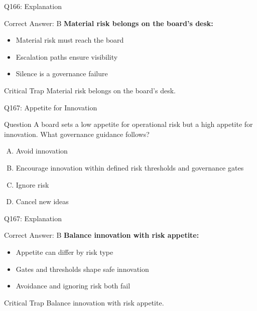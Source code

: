 \documentclass{beamer}
\begin{document}
	\begin{frame}{Q166: Explanation}
		\begin{block}{Correct Answer: B}
			\textbf{Material risk belongs on the board's desk:}
			\begin{itemize}
				\item Material risk must reach the board
				\item Escalation paths ensure visibility
				\item Silence is a governance failure
			\end{itemize}
		\end{block}
		\begin{alertblock}{Critical Trap}
			Material risk belongs on the board's desk.
		\end{alertblock}
	\end{frame}
	
	\begin{frame}{Q167: Appetite for Innovation}
		\begin{block}{Question}
			A board sets a low appetite for operational risk but a high appetite for innovation. What governance guidance follows?
		\end{block}
		\begin{enumerate}[(A)]
			\item Avoid innovation
			\item Encourage innovation within defined risk thresholds and governance gates
			\item Ignore risk
			\item Cancel new ideas
		\end{enumerate}
	\end{frame}
	
	\begin{frame}{Q167: Explanation}
		\begin{block}{Correct Answer: B}
			\textbf{Balance innovation with risk appetite:}
			\begin{itemize}
				\item Appetite can differ by risk type
				\item Gates and thresholds shape safe innovation
				\item Avoidance and ignoring risk both fail
			\end{itemize}
		\end{block}
		\begin{alertblock}{Critical Trap}
			Balance innovation with risk appetite.
		\end{alertblock}
	\end{frame}
	
\end{document}

